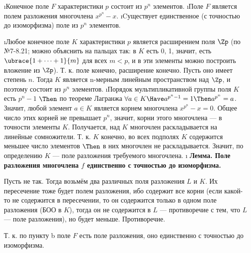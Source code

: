\begin{problem}
\begin{enumerate}
\def\labelenumi{\alph{enumi})}
\i Конечное поле $F$ характеристики $p$ состоит из $p^n$ элементов. 
\i Поле $F$ является полем разложения многочлена $x^{p^n}-x$. 
\i Cуществует единственное (с точностью до изоморфизма) поле из $p^n$ элементов.
\end{enumerate}
\end{problem}
\begin{solution}
\begin{enumerate}
\def\labelenumi{\alph{enumi})}
\i Любое конечное поле \(K\) характеристики $p$ является расширением поля \(\Zp\) (по №7-8.21; можно объяснить на пальцах так: в $K$ есть 0, 1, значит, есть $\ubrace{1+\dots+1}{m}$ для всех $m<p$, и в эти элементы можно построить вложение из $\Zp$). Т. к. поле конечно, расширение конечно. Пусть оно имеет степень $n$. Тогда \(K\) является n-мерным линейным пространством над \(\Zp\), и поэтому состоит из \(p^n\) элементов.
\i Порядок мультипликативной группы поля $K$ есть $p^n-1$ $\Then$ по теореме Лагранжа $\forall a \in K \Have a^{p^n-1}=1 \Then a^{p^n}=a$. Значит, любой элемент $a \in K$ является корнем многочлена $x^{p^n}-x=0$. Общее число этих корней не превышает $p^n$, значит, корни этого многочлена --- в точности элементы $K$. Получается, над $K$ многочлен раскладывается на линейные сомножители. Т. к. $K$ конечно, во всех подполях $K$ содержится меньшее число элементов $\Then$ в них многочлен не раскладывается. Значит, по определению $K$ --- поле разложения требуемого многочлена.
\i 
	\bf{Лемма.} Поле разложения многочлена \(f\) единственно с точностью до изоморфизма.
	\begin{solution}
	Пусть не так. Тогда возьмём два различных поля разложения $L$ и $K$. Их пересечение тоже будет полем разложения, ибо содержит все корни (если какой-то не содержится в пересечении, то он содержится только в одном поле разложения (БОО в $K$), тогда он не содержится в $L$ --- противоречие с тем, что $L$ --- поле разложения), но будет меньше. Противоречие.
	\end{solution}
	
	Т. к. по пункту b поле $F$ есть поле разложения, оно единственно с точностью до изоморфизма.
\end{enumerate}
\end{solution}

